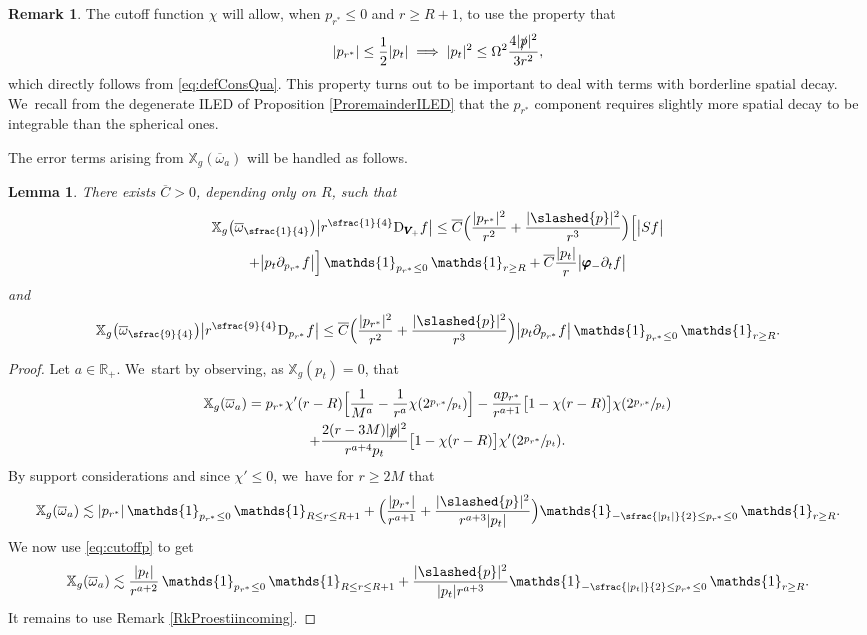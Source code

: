 \documentclass[JEP,XML,SOM,Unicode,published]{cedram}
\theoremstyle{plain}
\newtheorem{lemma}[proposition]{Lemma}
\theoremstyle{definition}
\newtheorem{remark}[proposition]{Remark}
\newcommand\R{{\mathbb{R}}}
\newcommand\T{{\mathbb{X}}}
\begin{document}
\begin{remark}
The cutoff function $\chi$ will allow, when $p_{r^*}\leq 0$ and $r \geq R+1$, to use the property that
\begin{equation}\label{eq:cutoffp}
|p_{r^*}| \leq \frac{1}{2}|p_t| \implies |p_t|^2 \leq \Omega^2\frac{4|\slashed{p}|^2}{3r^2},
\end{equation}
which directly follows from \eqref{eq:defConsQua}. This property turns out to be important to deal with terms with borderline spatial decay. We~recall from the degenerate ILED of Proposition \ref{ProremainderILED} that the $p_{r^*}$ component requires slightly more spatial decay to be integrable than the spherical ones.
\end{remark}
The error terms arising from $\T_g(\overline{\omega}_a)$ will be handled as follows.
\begin{lemma}\label{Lemerrorterm1}
There exists $\overline{C}>0$, depending only on $R$, such that
\begin{multline*}
\T_g \bigl(\overline{\omega}_{\sfrac{1}{4}} \bigr) \big| r^{\sfrac{1}{4}} \mathrm{D}_{\pmb{V}_{\! +}} f \big| \leq \overline{C}\Bigl(\frac{|p_{r^*}|^2}{r^2 }+ \frac{|\slashed{p}|^2}{r^3 } \Bigr) \Bigl[\big|Sf \big|
\\+ \big|p_t \partial_{p_{r^*}} f\big| \Bigr] \, \mathds{1}_{p_{r^*} \leq 0} \, \mathds{1}_{r \geq R}
+\overline{C}\frac{|p_t|}{r}\big| \pmb{\varphi}_- \partial_t f \big|
\end{multline*}
and
\[
\T_g \bigl(\overline{\omega}_{\sfrac{9}{4}} \bigr) \big|r^{\sfrac{9}{4}} \mathrm{D}_{p_{r^*}} f \big| \leq \overline{C} \Bigl(\frac{|p_{r^*}|^2}{r^2 }+ \frac{|\slashed{p}|^2}{r^3 } \Bigr) \big| p_t \partial_{p_{r^*}} f \big| \, \mathds{1}_{p_{r^*} \leq 0} \, \mathds{1}_{r \geq R}.
\]
\end{lemma}
\begin{proof}
Let $a \in \R_+$. We~start by observing, as $\T_g (p_t)=0$, that
\begin{multline*}
\T_g(\overline{\omega}_a) = p_{r^*} \chi' (r-R) \Bigl[\frac{1}{M^a}-\frac{1}{r^a}\chi(2\sfrac{p_{r^*}}{p_t}) \Bigr]- \frac{ap_{r^*}}{r^{a+1}}\bigl[ 1-\chi(r-R) \bigr] \chi(2\sfrac{p_{r^*}}{p_t}) \\
+ \frac{2(r-3M)|\slashed{p}|^2}{r^{a+4}p_t}\bigl[ 1-\chi(r-R) \bigr] \chi'(2\sfrac{p_{r^*}}{p_t}).
\end{multline*}
By support considerations and since $\chi' \leq 0$, we~have for $r \geq 2M$ that
\[
\T_g(\overline{\omega}_a) \lesssim |p_{r^*}| \,\mathds{1}_{p_{r^*} \leq 0} \, \mathds{1}_{R \leq r \leq R+1}+ \Bigl(\frac{|p_{r^*}|}{r^{a+1}} + \frac{|\slashed{p}|^2}{r^{a+3}|p_t|} \Bigr) \mathds{1}_{-\sfrac{|p_t|}{2} \leq p_{r^*} \leq 0} \, \mathds{1}_{r \geq R}.
\]
We now use \eqref{eq:cutoffp} to get
\begin{equation}\label{equation:unan}
\T_g(\overline{\omega}_a) \lesssim \frac{|p_t|}{r^{a+2}} \,\mathds{1}_{p_{r^*} \leq 0} \, \mathds{1}_{R \leq r \leq R+1}+ \frac{|\slashed{p}|^2}{|p_t|r^{a+3}} \mathds{1}_{-\sfrac{|p_t|}{2} \leq p_{r^*} \leq 0} \, \mathds{1}_{r \geq R}.
\end{equation}
It remains to use Remark \ref{RkProestiincoming}.
\end{proof}
\end{document}
